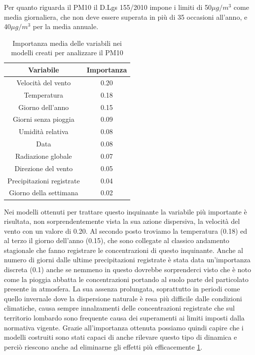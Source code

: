 \documentclass[a4paper,12pt]{report}
\begin{document}
Per quanto riguarda il PM10 il D.Lgs 155/2010 impone i limiti di 50$\mu g/m^3$ come media giornaliera, che non deve essere superata in più di 35 occasioni all'anno, e 40$\mu g/m^3$ per la media annuale.

\begin{table}[h!]
\centering
\begin{tabular}{ |c c| }
	\hline
	Variabile & Importanza \\
	\hline
	Velocità del vento & 0.20 \\
	Temperatura & 0.18 \\
	Giorno dell'anno & 0.15 \\
	Giorni senza pioggia & 0.09 \\
	Umidità relativa & 0.08 \\
	Data & 0.08 \\
	Radiazione globale & 0.07 \\
	Direzione del vento & 0.05 \\
	Precipitazioni registrate & 0.04 \\
	Giorno della settimana & 0.02 \\
	\hline
\end{tabular}
\caption{Importanza media delle variabili nei modelli creati per analizzare il PM10}
\label{table:importanza_pm10}
\end{table}

Nei modelli ottenuti per trattare questo inquinante la variabile più importante è risultata, non sorprendentemente vista la sua azione dispersiva, la velocità del vento con un valore di 0.20. Al secondo posto troviamo la temperatura (0.18) ed al terzo il giorno dell'anno (0.15), che sono collegate al classico andamento stagionale che fanno registrare le concentrazioni di questo inquinante. Anche al numero di giorni dalle ultime precipitazioni registrate è stata data un'importanza discreta (0.1) anche se nemmeno in questo dovrebbe sorprenderci visto che è noto come la pioggia abbatta le concentrazioni portando al suolo parte del particolato presente in atmosfera. La sua assenza prolungata, soprattutto in periodi come quello invernale dove la dispersione naturale è resa più difficile dalle condizioni climatiche, causa sempre innalzamenti delle concentrazioni registrate che sul territorio lombardo sono frequente causa dei superamenti ai limiti imposti dalla normativa vigente. Grazie all'importanza ottenuta possiamo quindi capire che i modelli costruiti sono stati capaci di anche rilevare questo tipo di dinamica e perciò riescono anche ad eliminarne gli effetti più efficacemente \ref{table:importanza_pm10}.
\end{document}

